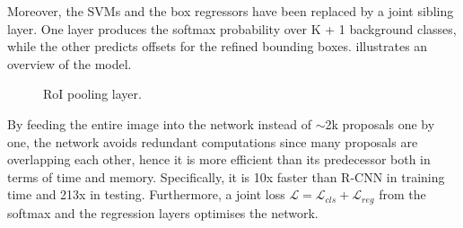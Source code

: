 Moreover, the SVMs and the box regressors have been replaced by a joint sibling layer. One layer produces the softmax probability over K + 1 background classes, while the other predicts offsets for the refined bounding boxes.  illustrates an overview of the model. 

\begin{figure}[!htb]
  \centering
  \caption{RoI pooling layer.}
  \label{fig4}
\end{figure}

By feeding the entire image into the network instead of $\sim$2k proposals one by one, the network avoids redundant computations since many proposals are overlapping each other, hence it is more efficient than its predecessor both in terms of time and memory. Specifically, it is 10x faster than R-CNN in training time and 213x in testing. Furthermore, a joint loss $\mathcal{L}=\mathcal{L}_{cls}+\mathcal{L}_{reg}$ from the softmax and the regression layers optimises the network.

